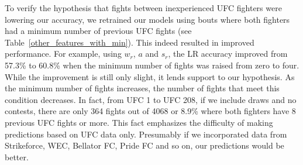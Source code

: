 To verify the hypothesis that fights between inexperienced UFC fighters were
lowering our accuracy, we retrained our models using
bouts where both fighters had a minimum number of previous
UFC fights (see Table~\ref{other_features_with_min}).
This indeed resulted in improved performance. For example,
using $w_r$, $a$ and $s_r$, the LR accuracy improved from 57.3\% to 60.8\% when the minimum
number of fights was raised from zero to four.
While the improvement is still only slight, it lends support
to our hypothesis. As the minimum number of fights increases,
the number of fights that meet this condition decreases. In fact,
from UFC 1 to UFC 208, if we include draws and no contests, there are
only 364 fights out of 4068 or 8.9\% where both fighters have 8 previous UFC
fights or more. This fact emphasizes the difficulty
of making predictions based on UFC data only. Presumably if we incorporated
data from Strikeforce, WEC, Bellator FC, Pride FC and so on, our predictions would
be better.


